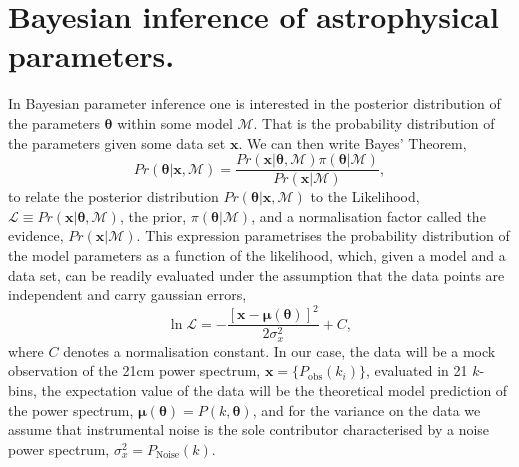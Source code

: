 \documentclass[useAMS,usenatbib]{mnras}
\begin{document}
\section{Bayesian inference of astrophysical parameters.}
\label{sec: bayesian}
In Bayesian parameter inference one is interested in the posterior distribution of the parameters $\boldsymbol{\theta}$ within some model $\mathcal{M}$. 
That is the probability distribution of the parameters given some data set $\boldsymbol{x}$.
We can then write Bayes' Theorem,
\begin{equation}
Pr(\boldsymbol{\theta} | \boldsymbol{x}, \mathcal{M}) = \frac{Pr(\boldsymbol{x} | \boldsymbol{\theta}, \mathcal{M}) \pi(\boldsymbol{\theta}| \mathcal{M}) }{Pr(\boldsymbol{x}| \mathcal{M})},
\end{equation}
to relate the posterior distribution $Pr(\boldsymbol{\theta} | \boldsymbol{x}, \mathcal{M})$ to the Likelihood, $\mathcal{L} \equiv Pr(\boldsymbol{x} | \boldsymbol{\theta}, \mathcal{M})$, the prior, $\pi(\boldsymbol{\theta}| \mathcal{M})$, and a normalisation factor called the evidence, $Pr(\boldsymbol{x}| \mathcal{M})$. 
This expression parametrises the probability distribution of the model parameters as a function of the likelihood, which, given a model and a data set, can be readily evaluated under the assumption that the data points are independent and carry gaussian errors, 
\begin{equation}
\ln \mathcal{L} = -\frac{\left[\boldsymbol{x} - \boldsymbol{\mu}(\boldsymbol{\theta})\right]^2}{2\sigma_x^2} + C,
\end{equation}
where $C$ denotes a normalisation constant.
In our case, the data will be a mock observation of the 21cm power spectrum, $\boldsymbol{x} = \{P_\text{obs}(k_i)\}$, evaluated in 21 $k$-bins, the expectation value of the data will be the theoretical model prediction of the power spectrum, $\boldsymbol{\mu}(\boldsymbol{\theta}) = P(k, \boldsymbol{\theta})$, and for the variance on the data we assume that instrumental noise is the sole contributor characterised by a noise power spectrum, $\sigma_x^2 = P_\text{Noise}(k)$.
\end{document}
